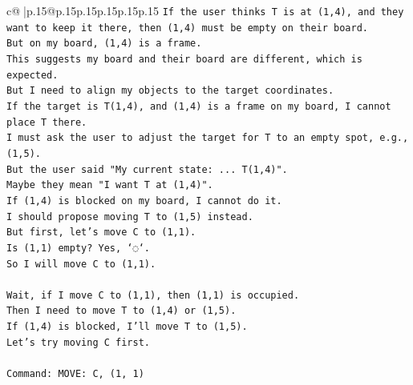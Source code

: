 \documentclass{article}
\begin{document}
{\begin{supertabular}{c@{$\;$}|p{.15\linewidth}@{}p{.15\linewidth}p{.15\linewidth}p{.15\linewidth}p{.15\linewidth}p{.15\linewidth}}
{{{\texttt{If the user thinks T is at (1,4), and they want to keep it there, then (1,4) must be empty on their board.} \\
\texttt{But on my board, (1,4) is a frame.} \\
\texttt{This suggests my board and their board are different, which is expected.} \\
\texttt{But I need to align my objects to the target coordinates.} \\
\texttt{If the target is T(1,4), and (1,4) is a frame on my board, I cannot place T there.} \\
\texttt{I must ask the user to adjust the target for T to an empty spot, e.g., (1,5).} \\
\texttt{But the user said "My current state: ... T(1,4)".} \\
\texttt{Maybe they mean "I want T at (1,4)".} \\
\texttt{If (1,4) is blocked on my board, I cannot do it.} \\
\texttt{I should propose moving T to (1,5) instead.} \\
\texttt{But first, let's move C to (1,1).} \\
\texttt{Is (1,1) empty? Yes, `◌`.} \\
\texttt{So I will move C to (1,1).} \\
\\ 
\texttt{Wait, if I move C to (1,1), then (1,1) is occupied.} \\
\texttt{Then I need to move T to (1,4) or (1,5).} \\
\texttt{If (1,4) is blocked, I'll move T to (1,5).} \\
\texttt{Let's try moving C first.} \\
\\ 
\texttt{Command: MOVE: C, (1, 1)} \\
            }
        }
    }
     \\ \\


\end{supertabular}}
\end{document}
